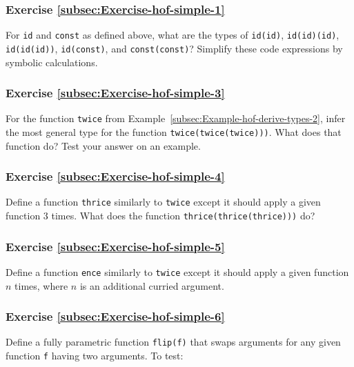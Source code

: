 \subsubsection{Exercise \label{subsec:Exercise-hof-simple-1}\ref{subsec:Exercise-hof-simple-1}}

For \lstinline!id! and \lstinline!const! as defined above, what
are the types of \lstinline!id(id)!, \lstinline!id(id)(id)!, \lstinline!id(id(id))!,
\lstinline!id(const)!, and \lstinline!const(const)!? Simplify these
code expressions by symbolic calculations.

\subsubsection{Exercise \label{subsec:Exercise-hof-simple-3}\ref{subsec:Exercise-hof-simple-3}}

For the function \lstinline!twice! from Example~\ref{subsec:Example-hof-derive-types-2},
infer the most general type for the function \lstinline!twice(twice(twice)))!.
What does that function do? Test your answer on an example.

\subsubsection{Exercise \label{subsec:Exercise-hof-simple-4}\ref{subsec:Exercise-hof-simple-4}}

Define a function \lstinline!thrice! similarly to \lstinline!twice!
except it should apply a given function $3$ times. What does the
function \lstinline!thrice(thrice(thrice)))! do?

\subsubsection{Exercise \label{subsec:Exercise-hof-simple-5}\ref{subsec:Exercise-hof-simple-5}}

Define a function \lstinline!ence! similarly to \lstinline!twice!
except it should apply a given function $n$ times, where $n$ is
an additional curried argument.

\subsubsection{Exercise \label{subsec:Exercise-hof-simple-6}\ref{subsec:Exercise-hof-simple-6}}

Define a fully parametric function \lstinline!flip(f)! that swaps
arguments for any given function \lstinline!f! having two arguments.
To test: 

